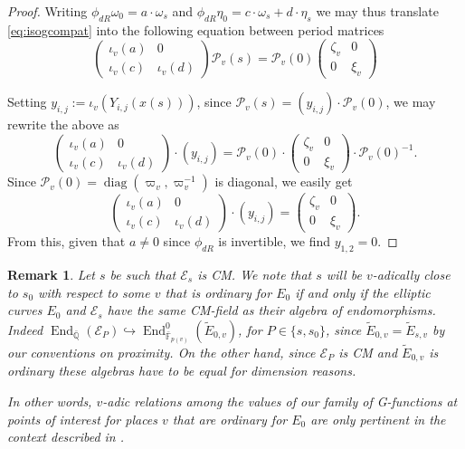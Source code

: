 \documentclass[12pt,twoside,a4paper]{article}
\theoremstyle{plain}%
\newtheorem{remark}[theorem]{Remark}
\DeclareMathOperator{\End}{End}
\DeclareMathOperator{\diag}{diag}
\newcommand{\Q}{\mathbb{Q}}
\newcommand{\CE}{\mathcal{E}}
\newcommand{\CP}{\mathcal{P}}
\begin{document}
\begin{proof}
Writing $\phi_{dR}\omega_0=a\cdot \omega_s$ and $\phi_{dR}\eta_0=c\cdot \omega_s+d\cdot \eta_s$ we may thus translate \eqref{eq:isogcompat} into the following equation between period matrices
\begin{equation}\label{eq:isogord1}	\begin{pmatrix}
			\iota_v(a)&0\\ \iota_v(c)&\iota_v(d)
	\end{pmatrix}\CP_v(s)=\CP_v(0)\begin{pmatrix}\zeta_v&0\\0&\xi_v\end{pmatrix}\end{equation}

Setting $y_{i,j}:=\iota_v(Y_{i,j}(x(s)))$, since $\CP_v(s)= (y_{i,j})\cdot \CP_v(0)$, we may rewrite the above as 
\begin{equation}
	\begin{pmatrix}
		\iota_v(a)&0\\ \iota_v(c)&\iota_v(d)
	\end{pmatrix}\cdot (y_{i,j})= \CP_v(0)\cdot \begin{pmatrix}\zeta_v&0\\0&\xi_v\end{pmatrix}\cdot \CP_v(0)^{-1}.
\end{equation}Since $\CP_v(0)=\diag(\varpi_v,\varpi_v^{-1})$ is diagonal, we easily get 
\begin{equation}
	\begin{pmatrix}
		\iota_v(a)&0\\\iota_v({c})&\iota_v(d)
	\end{pmatrix}\cdot (y_{i,j})=\begin{pmatrix}
	\zeta_v&0\\0&\xi_v
	\end{pmatrix}.
\end{equation}From this, given that $a\neq 0$ since $\phi_{dR}$ is invertible, we find $y_{1,2}=0$. \end{proof}

\begin{remark}\label{remarkordinaryproximity}
	Let $s$ be such that $\CE_s$ is CM. We note that $s$ will be $v$-adically close to $s_0$ with respect to some $v$ that is ordinary for $E_0$ if and only if the elliptic curves $E_0$ and $\CE_s$ have the same CM-field as their algebra of endomorphisms. Indeed $\End_{\bar{\Q}}(\CE_P)\hookrightarrow \End_{\bar{\mathbb{F}}_{p(v)}}^{0}(\tilde{E}_{0,v})$, for $P\in\{s,s_0\}$, since $\tilde{E}_{0,v} =\tilde{E}_{s,v}$ by our conventions on proximity. On the other hand, since $\CE_P$ is CM and $\tilde{E}_{0,v}$ is ordinary these algebras have to be equal for dimension reasons.
	
	In other words, $v$-adic relations among the values of our family of G-functions at points of interest for places $v$ that are ordinary for $E_0$ are only pertinent in the context described in . 
\end{remark}
\end{document}
